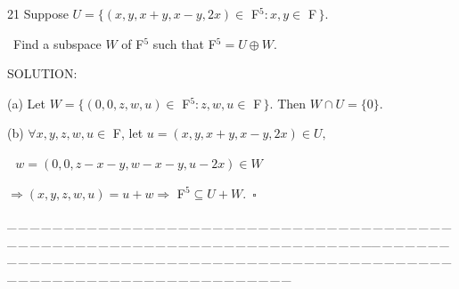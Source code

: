 \documentclass[a4paper, 11pt, UTF8]{article}
\begin{document}
\begin{large}
{\timesbf\Large 21} {\timessl\Large 
Suppose $U=\{(x,y,x+y,x-y,2x)\in$ {\timesbf F}$^5:x,y\in$ {\timesbf F}$\,\}$.}\par\quad\,
{\timessl\Large Find a subspace $W$ of {\timesbf F}$^5$ such that {\timesbf F}$^5=U\oplus W$.
}\par
{\timesbf S\footnotesize{OLUTION:}}\par\quad
(a) Let $W=\{(0,0,z,w,u)\in$ {\timesbf F}$^5:z,w,u\in$ {\timesbf F}$\,\}$. Then $W\cap U=\{0\}$.\par\quad
(b) $\forall x,y,z,w,u\in$ {\timesbf F}, let $u=(x,y,x+y,x-y,2x)\in U,$\par\qquad\qquad\qquad\qquad\quad\,\, $w=(0,0,z-x-y,w-x-y,u-2x)\in W$\par\qquad
$\Rightarrow (x,y,z,w,u)=u+w\Rightarrow$ {\timesbf F}$^5\subseteq U+W.\,\,\,\square$\par
{\tiny \_\,\_\,\_\,\_\,\_\,\_\,\_\,\_\,\_\,\_\,\_\,\_\,\_\,\_\,\_\,\_\,\_\,\_\,\_\,\_\,\_\,\_\,\_\,\_\,\_\,\_\,\_\,\_\,\_\,\_\,\_\,\_\,\_\,\_\,\_\,\_\,\_\,\_\,\_\,\_\,\_\,\_\,\_\,\_\,\_\,\_\,\_\,\_\,\_\,\_\,\_\,\_\,\_\,\_\,\_\,\_\,\_\,\_\,\_\,\_\,\_\,\_\,\_\,\_\,\_\,\_\,\_\,\_\,\_\,\_\,\_\_\,\_\,\_\,\_\,\_\,\_\,\_\,\_\,\_\,\_\,\_\,\_\,\_\,\_\,\_\,\_\,\_\,\_\,\_\,\_\,\_\,\_\,\_\,\_\,\_\,\_\,\_\,\_\,\_\,\_\,\_\,\_\,\_\,\_\,\_\,\_\,\_\,\_\,\_\,\_\,\_\,\_\,\_\,\_\,\_\,\_\,\_\,\_\,\_\,\_\,\_\,\_\,\_\,\_\,\_\,\_\,\_\,\_\,\_\,\_\,\_\,\_\,\_\,\_\,\_\,\_\,\_\,\_\,\_\,\_\,\_}\par


\end{large}
\end{document}
